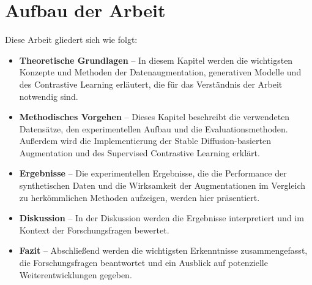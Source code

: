 \section{Aufbau der Arbeit} \label{sec:structure}

Diese Arbeit gliedert sich wie folgt:

\begin{itemize}
    \item \textbf{Theoretische Grundlagen} – In diesem Kapitel werden die wichtigsten Konzepte und Methoden der Datenaugmentation, generativen Modelle und des Contrastive Learning erläutert, die für das Verständnis der Arbeit notwendig sind.
    \item \textbf{Methodisches Vorgehen} – Dieses Kapitel beschreibt die verwendeten Datensätze, den experimentellen Aufbau und die Evaluationsmethoden. Außerdem wird die Implementierung der Stable Diffusion-basierten Augmentation und des Supervised Contrastive Learning erklärt.
    \item \textbf{Ergebnisse} – Die experimentellen Ergebnisse, die die Performance der synthetischen Daten und die Wirksamkeit der Augmentationen im Vergleich zu herkömmlichen Methoden aufzeigen, werden hier präsentiert.
    \item \textbf{Diskussion} – In der Diskussion werden die Ergebnisse interpretiert und im Kontext der Forschungsfragen bewertet.
    \item \textbf{Fazit} – Abschließend werden die wichtigsten Erkenntnisse zusammengefasst, die Forschungsfragen beantwortet und ein Ausblick auf potenzielle Weiterentwicklungen gegeben.
\end{itemize}